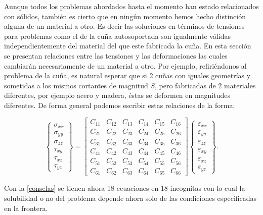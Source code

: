 \documentclass[../notas medios.tex]{subfiles}
\begin{document}
Aunque todos los problemas abordados hasta el momento han estado relacionados con sólidos, también es cierto que en ningún momento hemos hecho distinción alguna de un material a otro. Es decir las soluciones en términos de tensiones para problemas como el de la cuña autosoportada son igualmente válidas independientemente del material del que este fabricada la cuña. En esta sección se presentan  relaciones entre las tensiones y las deformaciones las cuales cambiarán necesariamente de un material a otro. Por ejemplo, refiriéndonos al problema de la cuña, es natural esperar que si 2 cuñas con iguales geometrías y sometidas a los mismos cortantes de magnitud $S$, pero fabricadas de 2 materiales diferentes, por ejemplo acero y madera, éstas se deformen en magnitudes diferentes. De forma general podemos escribir estas relaciones de la forma;

\begin{equation}
\left\{ \begin{array}{*{20}{c}}
\sigma_{xx}\\
\sigma _{yy}\\
\sigma _{zz}\\
\tau_{xy}\\
\tau_{xz}\\
\tau_{yz}
\end{array} \right\} = \left[ \begin{array}{*{20}{c}}
C_{11} &C_{12} &C_{13} &C_{14} &C_{15} &C_{16}\\
C_{21} &C_{22} &C_{23} &C_{24} &C_{25} &C_{26}\\
C_{31} &C_{32} &C_{33} &C_{34} &C_{35} &C_{36}\\
C_{41} &C_{42} &C_{43} &C_{44} &C_{45} &C_{46}\\
C_{51} &C_{52} &C_{53} &C_{54} &C_{55} &C_{56}\\
C_{61} &C_{62} &C_{63} &C_{64} &C_{65} &C_{66}
\end{array} \right]\left\{ \begin{array}{*{20}{c}}
\varepsilon_{xx}\\
\varepsilon_{yy}\\
\varepsilon_{zz}\\
\varepsilon_{xy}\\
\varepsilon_{xz}\\
\varepsilon_{yz}
\end{array} \right\}.
\label{conselas}
\end{equation}

Con la \cref{conselas} se tienen ahora 18 ecuaciones en 18 incognitas con lo cual la solubilidad o no del problema depende ahora solo de las condiciones especificadas en la frontera. 
%
\end{document}

